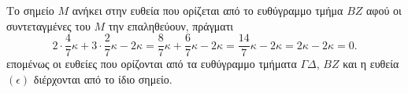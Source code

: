 Το σημείο $M$ ανήκει στην ευθεία που ορίζεται από το ευθύγραμμο τμήμα $BZ$ αφού οι συντεταγμένες του $M$ την επαληθεύουν, πράγματι
\[
2 \cdot \frac{4}{7}\kappa + 3 \cdot \frac{2}{7}\kappa - 2\kappa = \frac{8}{7}\kappa + \frac{6}{7}\kappa - 2\kappa = \frac{14}{7}\kappa - 2\kappa = 2\kappa - 2\kappa = 0.
\]
επομένως οι ευθείες που ορίζονται από τα ευθύγραμμο τμήματα $\Gamma\Delta$, $BZ$ και η ευθεία $(\epsilon)$ διέρχονται από το ίδιο σημείο.